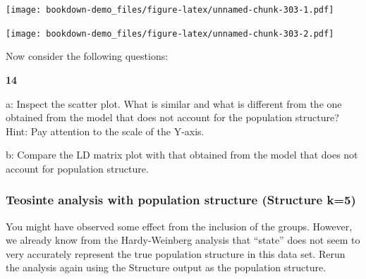 \documentclass[
]{book}
\makeatletter
\newenvironment{Shaded}{\begin{snugshade}}{\end{snugshade}}
\newcommand{\AttributeTok}[1]{\textcolor[rgb]{0.77,0.63,0.00}{#1}}
\newcommand{\DecValTok}[1]{\textcolor[rgb]{0.00,0.00,0.81}{#1}}
\newcommand{\FloatTok}[1]{\textcolor[rgb]{0.00,0.00,0.81}{#1}}
\newcommand{\FunctionTok}[1]{\textcolor[rgb]{0.00,0.00,0.00}{#1}}
\newcommand{\NormalTok}[1]{#1}
\newcommand{\OtherTok}[1]{\textcolor[rgb]{0.56,0.35,0.01}{#1}}
\newcommand{\SpecialCharTok}[1]{\textcolor[rgb]{0.00,0.00,0.00}{#1}}
\newcommand{\StringTok}[1]{\textcolor[rgb]{0.31,0.60,0.02}{#1}}
\newenvironment{kframe}{%
\medskip{}
\setlength{\fboxsep}{.8em}
 \def\at@end@of@kframe{}%
 \ifinner\ifhmode%
  \def\at@end@of@kframe{\end{minipage}}%
  \begin{minipage}{\columnwidth}%
 \fi\fi%
 \def\FrameCommand##1{\hskip\@totalleftmargin \hskip-\fboxsep
 \colorbox{shadecolor}{##1}\hskip-\fboxsep
     \hskip-\linewidth \hskip-\@totalleftmargin \hskip\columnwidth}%
 \MakeFramed {\advance\hsize-\width
   \@totalleftmargin\z@ \linewidth\hsize
   \@setminipage}}%
 {\par\unskip\endMakeFramed%
 \at@end@of@kframe}
\newenvironment{rmdblock}[1]
  {
  \begin{itemize}
  \renewcommand{\labelitemi}{
    \raisebox{-.7\height}[0pt][0pt]{
      {\setkeys{Gin}{width=3em,keepaspectratio}\texttt{[image: images/\#1]}}
    }
  }
  \setlength{\fboxsep}{1em}
  \begin{kframe}
  \item
  }
  {
  \end{kframe}
  \end{itemize}
  }
\newenvironment{rmdquiz}
  {\begin{rmdblock}{quiz}}
  {\end{rmdblock}}
\makeatother
\begin{document}
\texttt{[image: bookdown-demo\_files/figure-latex/unnamed-chunk-303-1.pdf]}

\begin{Shaded}
\end{Shaded}

\texttt{[image: bookdown-demo\_files/figure-latex/unnamed-chunk-303-2.pdf]}

Now consider the following questions:

\begin{rmdquiz}
\textbf{14}

a: Inspect the scatter plot. What is similar and what is different from the one obtained from the model that does not account for the population structure? Hint: Pay attention to the scale of the Y-axis.

b: Compare the LD matrix plot with that obtained from the model that does not account for population structure.
\end{rmdquiz}

\hypertarget{teosinte-analysis-with-population-structure-structure-k5}{%
\subsubsection{Teosinte analysis with population structure (Structure k=5)}\label{teosinte-analysis-with-population-structure-structure-k5}}

You might have observed some effect from the inclusion of the groups. However, we already know from the Hardy-Weinberg analysis that ``state'' does not seem to very accurately represent the true population structure in this data set. Rerun the analysis again using the Structure output as the population structure.
\end{document}
